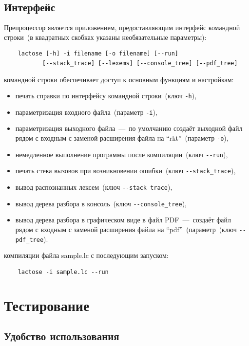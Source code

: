 \documentclass[12pt,a4paper,oneside]{extarticle}
\begin{document}
    \subsection{Интерфейс}
        Препроцессор является приложением, предоставляющим интерфейс командной строки~(в квадратных скобках указаны необязательные параметры):
        \begin{lstlisting}        
    lactose [-h] -i filename [-o filename] [--run]
           [--stack_trace] [--lexems] [--console_tree] [--pdf_tree]
        \end{lstlisting}

         командной строки обеспечивает доступ к основным функциям и настройкам:
        \begin{itemize}
                \item печать справки по интерфейсу командной строки~(ключ \lstinline$-h$),
                \item параметризация входного файла~(параметр \lstinline$-i$),
                \item параметризация выходного файла~---~по умолчанию создаёт выходной файл рядом с входным с заменой расширения файла на ``rkt''~(параметр \lstinline$-o$),
                \item немедленное выполнение программы после компиляции~(ключ \lstinline$--run$),
                \item печать стека вызовов при возникновении ошибки~(ключ \lstinline$--stack_trace$),
                \item вывод распознанных лексем~(ключ \lstinline$--stack_trace$),
                \item вывод дерева разбора в консоль~(ключ \lstinline$--console_tree$),
                \item вывод дерева разбора в графическом виде в файл PDF~---~создаёт файл рядом с входным с заменой расширения файла на ``pdf''~(параметр~(ключ \lstinline$--pdf_tree$).
        \end{itemize}

         компиляции файла sample.lc с последующим запуском:
        \begin{lstlisting}        
    lactose -i sample.lc --run
        \end{lstlisting}
\clearpage

\section{Тестирование}
    \subsection{Удобство использования}
        
\end{document}
